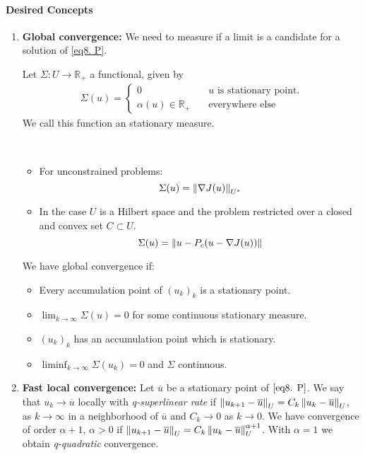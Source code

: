\paragraph{Desired Concepts}
\begin{enumerate}
	\item \textbf{Global convergence: }We need to measure if a limit is a candidate for a solution of \eqref{eq8. P}.
	\begin{definition}
		Let $\Sigma: U\rightarrow \mathbb{R}_+$ a functional, given by
		\begin{align*}
		\Sigma(u)=
		\left\lbrace	
		\begin{array}{ll}
			0 & \quad u \text{ is stationary point}.\\
			\alpha(u) \in \mathbb{R}_+ & \quad \text{everywhere else}			
			\end{array}
		\right.
		\end{align*}
	We call this function an stationary measure. 
	\end{definition}
	\begin{example}\
	\begin{itemize}
		\item For unconstrained problems: \[\Sigma(u)=\left\lVert\nabla J(u)\right\rVert_{U^*}\]
		\item In the case $U$ is a Hilbert space and the problem restricted over a closed and convex set $C\subset U$. 
		\[
		\Sigma(u)= \left\lVert u-P_c(u-\nabla J(u))\right\rVert
		\]
	\end{itemize}
	\end{example}
	We have global convergence if:
	\begin{itemize}
		\item Every accumulation point of $(u_k)_k$ is a stationary point.
		\item $\lim_{k\rightarrow \infty} \Sigma(u)=0$ for some continuous stationary measure.
		\item $(u_k)_k$ has an accumulation point which is stationary.
		\item $\liminf_{k\rightarrow\infty} \Sigma(u_k) =0$ and $\Sigma$ continuous.
	\end{itemize}
	\item \textbf{Fast local convergence:}
	Let $\overline{u}$ be a stationary point of $\eqref{eq8. P}$. We say that $u_k \rightarrow \overline{u}$ locally with \textit{q-superlinear rate} if $\left\lVert u_{k+1}-\overline{u}\right\rVert_U=C_k\left\lVert u_k-\overline{u}\right\rVert_U$, as $k\rightarrow \infty$ in a neighborhood of $\overline{u}$ and $C_k\rightarrow 0$ as $k\rightarrow 0$.
	We have convergence of order $\alpha +1$, $\alpha >0$ if 
	$\left\lVert u_{k+1}-\overline{u}\right\rVert_U=C_k\left\lVert u_k-\overline{u}\right\rVert^{\alpha+1}_U$. With $\alpha =1$ we obtain \textit{q-quadratic} convergence.
\end{enumerate}


